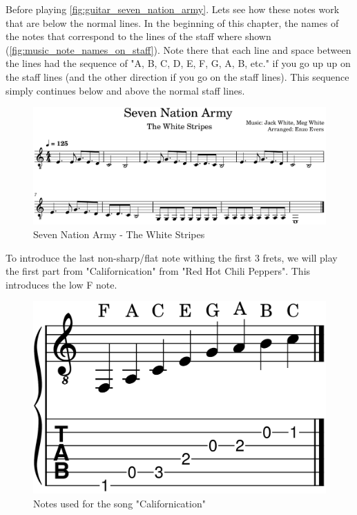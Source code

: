 Before playing \autoref{fig:guitar_seven_nation_army}. Lets see how these notes work that are below the normal lines. In the beginning of this chapter, the names of the notes that correspond to the lines of the staff where shown (\autoref{fig:music_note_names_on_staff}). Note there that each line and space between the lines had the sequence of "A, B, C, D, E, F, G, A, B, etc." if you go up up on the staff lines (and the other direction if you go on the staff lines). This sequence simply continues below and above the normal staff lines.

\begin{figure}[h]
	\centering
	\includegraphics[width=\textwidth]{../../MuseScore/Guitar/GuitarSevenNationArmyTheWhiteStripes.png}
	\caption{Seven Nation Army - The White Stripes}
	\label{fig:guitar_seven_nation_army}
\end{figure}

\newpage

To introduce the last non-sharp/flat note withing the first 3 frets, we will play the first part from "Californication" from "Red Hot Chili Peppers". This introduces the low F note.

\begin{figure}[h]
	\centering
	\includegraphics[height=0.12\textheight]{../../MuseScore/Guitar/GuitarNotesUsedInCalifornication.png}
	\caption{Notes used for the song "Californication"}
	\label{fig:guitar_notes_for_californication}
\end{figure}

